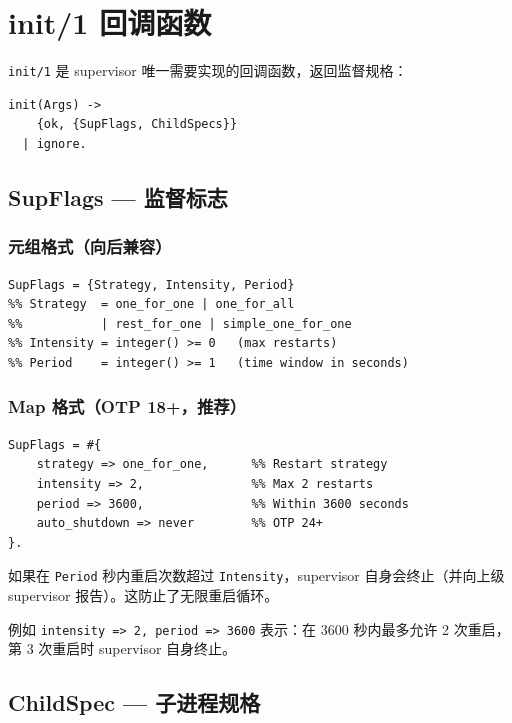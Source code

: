 \documentclass[a4paper,11pt]{article}
\begin{document}
\section{init/1 回调函数}

\texttt{init/1} 是 supervisor 唯一需要实现的回调函数，返回监督规格：

\begin{lstlisting}[style=erlangstyle]
init(Args) ->
    {ok, {SupFlags, ChildSpecs}}
  | ignore.
\end{lstlisting}

\subsection{SupFlags --- 监督标志}

\subsubsection{元组格式（向后兼容）}

\begin{lstlisting}[style=erlangstyle]
SupFlags = {Strategy, Intensity, Period}
%% Strategy  = one_for_one | one_for_all
%%           | rest_for_one | simple_one_for_one
%% Intensity = integer() >= 0   (max restarts)
%% Period    = integer() >= 1   (time window in seconds)
\end{lstlisting}

\subsubsection{Map 格式（OTP 18+，推荐）}

\begin{lstlisting}[style=erlangstyle]
SupFlags = #{
    strategy => one_for_one,      %% Restart strategy
    intensity => 2,               %% Max 2 restarts
    period => 3600,               %% Within 3600 seconds
    auto_shutdown => never        %% OTP 24+
}.
\end{lstlisting}

\begin{notebox}[重启频率限制]
如果在 \texttt{Period} 秒内重启次数超过 \texttt{Intensity}，supervisor 自身会终止（并向上级 supervisor 报告）。这防止了无限重启循环。

例如 \texttt{intensity => 2, period => 3600} 表示：在 3600 秒内最多允许 2 次重启，第 3 次重启时 supervisor 自身终止。
\end{notebox}

\subsection{ChildSpec --- 子进程规格}
\end{document}
